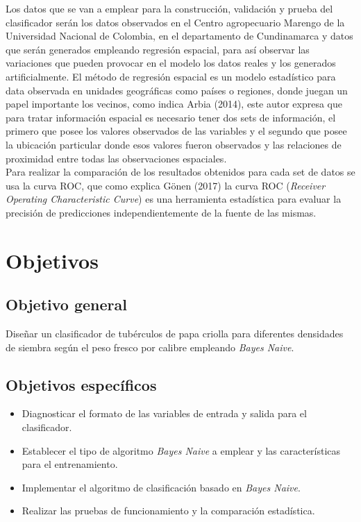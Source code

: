 Los datos que se van a emplear para la construcción, validación y prueba del clasificador serán los datos observados en el Centro agropecuario Marengo de la Universidad Nacional de Colombia, en el departamento de Cundinamarca y datos que serán generados empleando regresión espacial, para así observar las variaciones que pueden provocar en el modelo los datos reales y los generados artificialmente. El método de regresión espacial es un modelo estadístico para data observada en unidades geográficas como países o regiones, donde juegan un papel importante los vecinos, como indica Arbia (2014), este autor expresa que para tratar información espacial es necesario tener dos sets de información, el primero que posee los valores observados de las variables y el segundo que posee la ubicación particular donde esos valores fueron observados y las relaciones de proximidad entre todas las observaciones espaciales.\\

Para realizar la comparación de los resultados obtenidos para cada set de datos se usa la curva ROC, que como explica Gönen (2017) la curva ROC (\textit{Receiver Operating Characteristic Curve}) es una herramienta estadística para evaluar la precisión de predicciones independientemente de la fuente de las mismas.

\section{Objetivos}

\subsection{Objetivo general}

Diseñar un clasificador de tubérculos de papa criolla para diferentes densidades de siembra según el peso fresco por calibre empleando \textit{Bayes Naive}.

\subsection{Objetivos espec\'ificos}

\begin{itemize}
\item  Diagnosticar el formato de las variables de entrada y salida para el clasificador.
\item	 Establecer el tipo de algoritmo \textit{Bayes Naive} a emplear  y las características para el entrenamiento.
\item  Implementar el algoritmo de clasificación basado en \textit{Bayes Naive}.
\item  Realizar las pruebas de funcionamiento y la comparación estadística.
\end{itemize}

